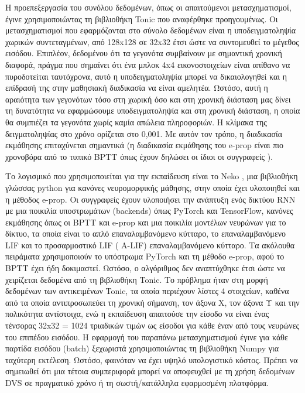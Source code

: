 \documentclass[12pt]{report}
\begin{document}
Η προεπεξεργασία του συνόλου δεδομένων, όπως οι απαιτούμενοι μετασχηματισμοί, έγινε χρησιμοποιώντας τη βιβλιοθήκη \textlatin{Tonic} που αναφέρθηκε προηγουμένως. Οι μετασχηματισμοί που εφαρμόζονται στο σύνολο δεδομένων είναι η υποδειγματοληψία χωρικών συντεταγμένων, από 128\textlatin{x}128 σε 32\textlatin{x}32 έτσι ώστε να συντομευθεί το μέγεθος εισόδου. Επιπλέον, δεδομένου ότι τα γεγονότα συμβαίνουν με σημαντική χρονική διαφορά, πράγμα που σημαίνει ότι ένα μπλοκ 4\textlatin{x}4 εικονοστοιχείων είναι απίθανο να πυροδοτείται ταυτόχρονα, αυτό η υποδειγματοληψία μπορεί να δικαιολογηθεί και η επίδρασή της στην μαθησιακή διαδικασία να είναι αμελητέα. Ωστόσο, αυτή η αραιότητα των γεγονότων τόσο στη χωρική όσο και στη χρονική διάσταση μας δίνει τη δυνατότητα να εφαρμώσουμε υποδειγματοληψία και στη χρονική διάσταση, η οποία θα συμπιέζει τα γεγονότα χωρίς καμία απώλεια πληροφοριών. Η κλίμακα της δειγματοληψίας στο χρόνο ορίζεται στο 0,001. Με αυτόν τον τρόπο, η διαδικασία εκμάθησης επιταχύνεται σημαντικά (η διαδικασία εκμάθησης του \textlatin{e-prop} είναι πιο χρονοβόρα από το τυπικό \textlatin{BPTT} όπως έχουν δηλώσει οι ίδιοι οι συγγραφείς \cite{Bellec2020}).

Το λογισμικό που χρησιμοποιείται για την εκπαίδευση είναι το \textlatin{Neko} \cite{Brasoveanu2020}, μια βιβλιοθήκη γλώσσας \textlatin{python} για κανόνες νευρομορφικής μάθησης, στην οποία έχει υλοποιηθεί και η μέθοδος \textlatin{e-prop}. Οι συγγραφείς έχουν υλοποιήσει την ανάπτυξη ενός δικτύου \textlatin{RNN} με μια ποικιλία υποστρωμάτων (\textlatin{backends}) όπως \textlatin{PyTorch} και \textlatin{TensorFlow}, κανόνες εκμάθησης όπως οι \textlatin{BPTT} και \textlatin{e-prop} και μια ποικιλία μοντέλων νευρώνων για το δίκτυο, τα οποία είναι το απλό επαναλαμβανόμενο κύτταρο, το επαναλαμβανόμενο \textlatin{LIF} και το προσαρμοστικό \textlatin{LIF ( A-LIF)} επαναλαμβανόμενο κύτταρο. Τα ακόλουθα πειράματα χρησιμοποιούν το υπόστρωμα \textlatin{PyTorch} και τη μέθοδο \textlatin{e-prop}, αφού το \textlatin{BPTT} έχει ήδη δοκιμαστεί. Ωστόσο, ο αλγόριθμος δεν αναπτύχθηκε έτσι ώστε να χειρίζεται δεδομένα από τη βιβλιοθήκη \textlatin{Tonic}. Το πρόβλημα ήταν στη μορφή δεδομένων των αντικειμένων \textlatin{Tonic}, τα οποία περιέχουν λίστες 4 στοιχείων, καθένα από τα οποία αντιπροσωπεύει τη χρονική σήμανση, τον άξονα \textlatin{Χ}, τον άξονα \textlatin{Υ} και την πολικότητα αντίστοιχα, ενώ η εκπαίδευση απαιτούσε την είσοδο να είναι ένας τένσορας 32\textlatin{x}32 = 1024 τριαδικών τιμών ως είσοδοι για κάθε έναν από τους νευρώνες του επιπέδου εισόδου. Η εφαρμογή του παραπάνω μετασχηματισμού έγινε για κάθε παρτίδα εισόδου (\textlatin{batch}) ξεχωριστά χρησιμοποιώντας τη βιβλιοθήκη \textlatin{Numpy} για ταχύτερη εκτέλεση. Ωστόσο, φαινόταν να έχει υψηλό υπολογιστικό κόστος. Πρέπει να σημειωθεί ότι μια τέτοια συμπεριφορά μπορεί να αποφευχθεί με τη χρήση δεδομένων \textlatin{DVS} σε πραγματικό χρόνο ή τη σωστή/κατάλληλα εφαρμοσμένη πλατφόρμα.
\end{document}
